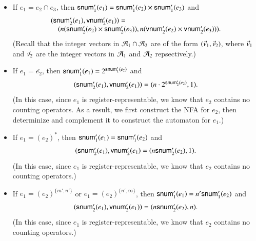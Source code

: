 {\begin{itemize}
$$\begin{array}{l }
 \end{array}
  $$
 (Recall that each integer vector in $\aut_1$ resp. $\aut_2$ is copied at most twice in the construction of $\aut_1 \cup \aut_2$.)
%
 \item If $e_1 = e_2 \cap e_3$, then ${\sf snum}'_1(e_1) = {\sf snum}'_1(e_2) \times {\sf snum}'_1(e_3)$ and 
%
  $$
  \begin{array}{l }
 ({\sf snum}'_2(e_1), {\sf vnum}'_2(e_1)) =  \\
  \ \ \ \ (n({\sf snum}'_2(e_2) \times {\sf snum}'_2(e_3)),  n({\sf vnum}'_2(e_2) \times {\sf vnum}'_2(e_3)) 
  ).
 \end{array}
  $$
  (Recall that the integer vectors in $\mathcal{A}_1 \cap \mathcal{A}_2$ are of the form $(\vec{v}_1, \vec{v}_2)$, where $\vec{v}_1$ and $\vec{v}_2$ are the integer vectors in $\aut_1$ and $\aut_2$ repsectively.)
%
 \item If $e_1 = \overline{e_2}$, then ${\sf snum}'_1(e_1) = 2^{{\sf snum}'_1(e_2)}$ and 
%
  $$
 \begin{array}{l }
 ({\sf snum}'_2(e_1), {\sf vnum}'_2(e_1)) = (n \cdot 2^{{\sf snum}'_2(e_2)}, 1).
 \end{array}
  $$
 (In this case, since $e_1$ is register-representable, we know that $e_2$ contains no counting operators. As a result, we first construct the NFA for $e_2$, then determinize and complement it to construct the automaton for $e_1$.) 
%
%
 \item If $e_1 = (e_2)^*$, then ${\sf snum}'_1(e_1) = {\sf snum}'_1(e_2)$ and 
%
  $$
 \begin{array}{l }
 ({\sf snum}'_2(e_1), {\sf vnum}'_2(e_1) =  (n {\sf snum}'_2(e_2), 1).
 \end{array}
  $$
  (In this case, since $e_1$ is register-representable, we know that $e_2$ contains no counting operators.)
 \item If $e_1 = (e_2)^{\{m', n'\}}$ or $e_1 = (e_2)^{\{n', \infty\}}$, then ${\sf snum}'_1(e_1) = n' {\sf snum}'_1(e_2)$ and 
%
  $$
 \begin{array}{l }
 ({\sf snum}'_2(e_1), {\sf vnum}'_2(e_1)) =  (n {\sf snum}'_2(e_2), n).
\end{array}
  $$
  (In this case, since $e_1$ is register-representable, we know that $e_2$ contains no counting operators.)
\end{itemize}
}
